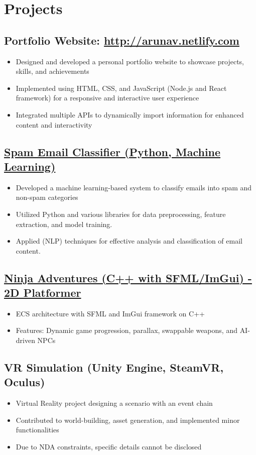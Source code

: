 \documentclass[10pt]{article}
\begin{document}
\section{Projects}
\subsection{Portfolio Website: \href{http://arunav.netlify.com}{http://arunav.netlify.com} \hfill }
\begin{itemize}
    \item Designed and developed a personal portfolio website to showcase projects, skills, and achievements
    \item Implemented using HTML, CSS, and JavaScript (Node.js and React framework) for a responsive and interactive user experience
    \item Integrated multiple APIs to dynamically import information for enhanced content and interactivity
\end{itemize}
\subsection{\href{https://github.com/ARNAB814/Spam-Email-Classifier}{Spam Email Classifier (Python, Machine Learning)} \hfill }
\begin{itemize}
    \item Developed a machine learning-based system to classify emails into spam and non-spam categories
    \item Utilized Python and various libraries for data preprocessing, feature extraction, and model training.
    \item Applied (NLP) techniques for effective analysis and classification of email content.
\end{itemize}


\subsection{\href{https://github.com/ARNAB814/Ninja-Adventure-Demo}{Ninja Adventures (C++ with SFML/ImGui) - 2D Platformer} \hfill }
\begin{itemize}
    \item ECS architecture with SFML and ImGui framework on C++
    \item Features: Dynamic game progression, parallax, swappable weapons, and AI-driven NPCs
    \begin{itemize}
    \end{itemize}
\end{itemize}

\subsection{VR Simulation (Unity Engine, SteamVR, Oculus) \hfill }
\begin{itemize}
    \item Virtual Reality project designing a scenario with an event chain
    \item Contributed to world-building, asset generation, and implemented minor functionalities
    \item Due to NDA constraints, specific details cannot be disclosed
\end{itemize}
\end{document}
